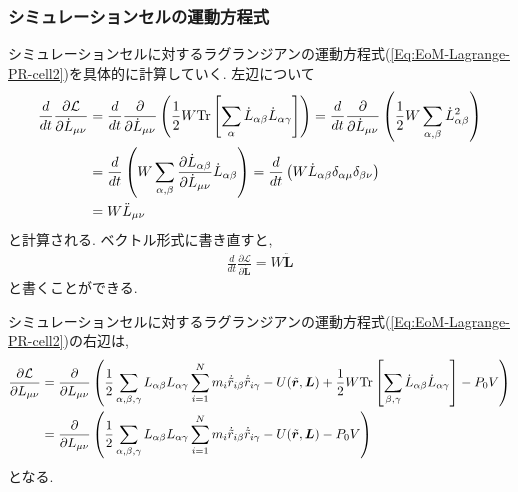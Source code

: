 \subsubsection{シミュレーションセルの運動方程式}
シミュレーションセルに対するラグランジアンの運動方程式(\ref{Eq:EoM-Lagrange-PR-cell2})を具体的に計算していく. 左辺について
\begin{align}
  \frac{d}{dt}
  \frac{\partial \mathcal{L}}{\partial \dot{L}_{\mu\nu}}
  &=
  \frac{d}{dt}
  \frac{\partial}{\partial \dot{L}_{\mu\nu}}
  \left(
    \frac{1}{2} W
    \mathrm{Tr}
    \left[
      \sum_{\alpha}
      \dot{L}_{\alpha \beta}
      \dot{L}_{\alpha \gamma}
    \right]
  \right)
  =
  \frac{d}{dt}
  \frac{\partial}{\partial \dot{L}_{\mu\nu}}
  \left(
    \frac{1}{2} W
    \sum_{\alpha, \beta}
    \dot{L}_{\alpha \beta}^{2}
  \right)
  \notag \\
  &=
  \frac{d}{dt}
  \left(
    W
    \sum_{\alpha,\beta}
    \frac{\partial \dot{L}_{\alpha \beta}}{\partial \dot{L}_{\mu\nu}}
    \dot{L}_{\alpha \beta}
  \right)
  =
  \frac{d}{dt}
  \left(
    W
    \dot{L}_{\alpha\beta}
    \delta_{\alpha\mu}
    \delta_{\beta \nu}
  \right)
  \notag \\
  &=
  W \ddot{L}_{\mu\nu}
  \notag
\end{align}
と計算される. ベクトル形式に書き直すと,
\begin{align}
  \frac{d}{dt}
  \frac{\partial \mathcal{L}}{\partial \dot{\bm{L}}}
  =
  W \ddot{\bm{L}}
  \label{Eq:EoM-PR-cell-left1}
\end{align}
と書くことができる.

シミュレーションセルに対するラグランジアンの運動方程式(\ref{Eq:EoM-Lagrange-PR-cell2})の右辺は, 
\begin{align}
  \frac{\partial \mathcal{L}}{\partial L_{\mu\nu}}
  &=
  \frac{\partial}{\partial L_{\mu\nu}}
  \left(
    \frac{1}{2}
    \sum_{\alpha,\beta,\gamma}
    L_{\alpha\beta} L_{\alpha\gamma}
    \sum_{i=1}^{N} m_{i}
    \dot{\tilde{r}}_{i\beta} \dot{\tilde{r}}_{i\gamma}
    -
    U(\tilde{\bm{r}}, \bm{L})
    +
    \frac{1}{2} W
    \mathrm{Tr}
    \left[
      \sum_{\beta, \gamma}
      \dot{L}_{\alpha \beta} \dot{L}_{\alpha \gamma}
    \right]
    -
    P_{0} V
  \right)
  \notag \\
  &=
  \frac{\partial}{\partial L_{\mu\nu}}
  \left(
    \frac{1}{2}
    \sum_{\alpha,\beta,\gamma}
    L_{\alpha\beta} L_{\alpha\gamma}
    \sum_{i=1}^{N} m_{i}
    \dot{\tilde{r}}_{i\beta} \dot{\tilde{r}}_{i\gamma}
    -
    U(\tilde{\bm{r}}, \bm{L})
    -
    P_{0} V
  \right)
  \label{Eq:EoM-PR-cell-right-all}
\end{align}
となる.

